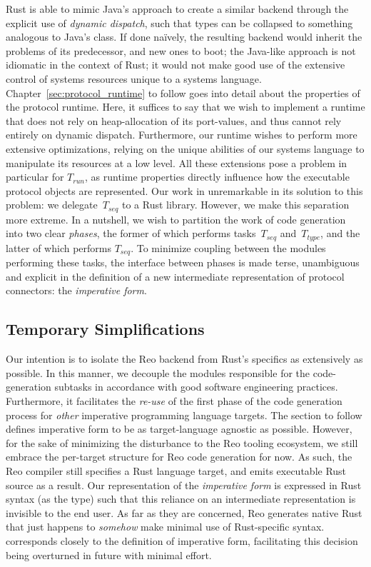 Rust is able to mimic Java's approach to create a similar backend through the explicit use of \textit{dynamic dispatch}, such that types can be collapsed to something analogous to Java's  class. If done na\"ively, the resulting backend would inherit the problems of its predecessor, and new ones to boot; the Java-like approach is not idiomatic in the context of Rust; it would not make good use of the extensive control of systems resources unique to a systems language. Chapter~\ref{sec:protocol_runtime} to follow goes into detail about the properties of the protocol runtime. Here, it suffices to say that we wish to implement a runtime that does not rely on heap-allocation of its port-values, and thus cannot rely entirely on dynamic dispatch. Furthermore, our runtime wishes to perform more extensive optimizations, relying on the unique abilities of our systems language to manipulate its resources at a low level. All these extensions pose a problem in particular for $T_{run}$, as runtime properties directly influence how the executable protocol objects are represented. Our work in unremarkable in its solution to this problem: we delegate~$T_{seq}$ to a Rust library. However, we make this separation more extreme. In a nutshell, we wish to partition the work of code generation into two clear \textit{phases}, the former of which performs tasks~$T_{seq}$ and~$T_{type}$, and the latter of which performs $T_{seq}$. To minimize coupling between the modules performing these tasks, the interface between phases is made terse, unambiguous and explicit in the definition of a new intermediate representation of protocol connectors: the \textit{imperative form}.

\subsection{Temporary Simplifications}
Our intention is to isolate the Reo backend from Rust's specifics as extensively as possible. In this manner, we decouple the modules responsible for the code-generation subtasks in accordance with good software engineering practices. Furthermore, it facilitates the \textit{re-use} of the first phase of the code generation process for \textit{other} imperative programming language targets. The section to follow defines imperative form to be as target-language agnostic as possible. However, for the sake of minimizing the disturbance to the Reo tooling ecosystem, we still embrace the per-target structure for Reo code generation for now. As such, the Reo compiler still specifies a Rust language target, and emits executable Rust source as a result. Our representation of the \textit{imperative form} is expressed in Rust syntax (as the  type) such that this reliance on an intermediate representation is invisible to the end user. As far as they are concerned, Reo generates native Rust that just happens to \textit{somehow} make minimal use of Rust-specific syntax.  corresponds closely to the definition of imperative form, facilitating this decision being overturned in future with minimal effort.


